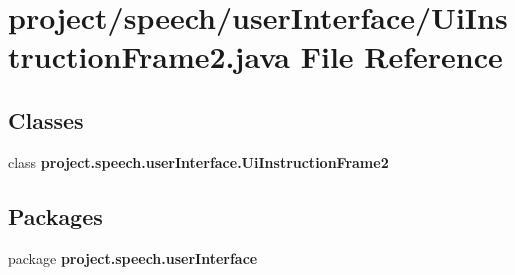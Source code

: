 \section{project/speech/user\+Interface/\+Ui\+Instruction\+Frame2.java File Reference}
\label{_ui_instruction_frame2_8java}
\subsection*{Classes}
\begin{DoxyCompactItemize}
\item 
class {\bf project.\+speech.\+user\+Interface.\+Ui\+Instruction\+Frame2}
\end{DoxyCompactItemize}
\subsection*{Packages}
\begin{DoxyCompactItemize}
\item 
package {\bf project.\+speech.\+user\+Interface}
\end{DoxyCompactItemize}
